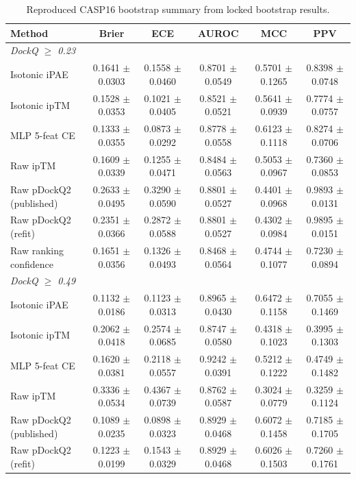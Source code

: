 \begin{table}[t]
\centering
\caption{Reproduced CASP16 bootstrap summary from locked bootstrap results.}
\label{tab:casp16_reproduced}
\begin{tabular}{lccccc}
\toprule
Method & Brier & ECE & AUROC & MCC & PPV \\
\midrule
\multicolumn{6}{l}{\textit{DockQ $\geq$ 0.23}} \\
Isotonic iPAE & 0.1641 $\pm$ 0.0303 & 0.1558 $\pm$ 0.0460 & 0.8701 $\pm$ 0.0549 & 0.5701 $\pm$ 0.1265 & 0.8398 $\pm$ 0.0748 \\
Isotonic ipTM & 0.1528 $\pm$ 0.0353 & 0.1021 $\pm$ 0.0405 & 0.8521 $\pm$ 0.0521 & 0.5641 $\pm$ 0.0939 & 0.7774 $\pm$ 0.0757 \\
MLP 5-feat CE & 0.1333 $\pm$ 0.0355 & 0.0873 $\pm$ 0.0292 & 0.8778 $\pm$ 0.0558 & 0.6123 $\pm$ 0.1118 & 0.8274 $\pm$ 0.0706 \\
Raw ipTM & 0.1609 $\pm$ 0.0339 & 0.1255 $\pm$ 0.0471 & 0.8484 $\pm$ 0.0563 & 0.5053 $\pm$ 0.0967 & 0.7360 $\pm$ 0.0853 \\
Raw pDockQ2 (published) & 0.2633 $\pm$ 0.0495 & 0.3290 $\pm$ 0.0590 & 0.8801 $\pm$ 0.0527 & 0.4401 $\pm$ 0.0968 & 0.9893 $\pm$ 0.0131 \\
Raw pDockQ2 (refit) & 0.2351 $\pm$ 0.0366 & 0.2872 $\pm$ 0.0588 & 0.8801 $\pm$ 0.0527 & 0.4302 $\pm$ 0.0984 & 0.9895 $\pm$ 0.0151 \\
Raw ranking confidence & 0.1651 $\pm$ 0.0356 & 0.1326 $\pm$ 0.0493 & 0.8468 $\pm$ 0.0564 & 0.4744 $\pm$ 0.1077 & 0.7230 $\pm$ 0.0894 \\
\midrule
\multicolumn{6}{l}{\textit{DockQ $\geq$ 0.49}} \\
Isotonic iPAE & 0.1132 $\pm$ 0.0186 & 0.1123 $\pm$ 0.0313 & 0.8965 $\pm$ 0.0430 & 0.6472 $\pm$ 0.1158 & 0.7055 $\pm$ 0.1469 \\
Isotonic ipTM & 0.2062 $\pm$ 0.0418 & 0.2574 $\pm$ 0.0685 & 0.8747 $\pm$ 0.0580 & 0.4318 $\pm$ 0.1023 & 0.3995 $\pm$ 0.1303 \\
MLP 5-feat CE & 0.1620 $\pm$ 0.0381 & 0.2118 $\pm$ 0.0557 & 0.9242 $\pm$ 0.0391 & 0.5212 $\pm$ 0.1222 & 0.4749 $\pm$ 0.1482 \\
Raw ipTM & 0.3336 $\pm$ 0.0534 & 0.4367 $\pm$ 0.0739 & 0.8762 $\pm$ 0.0587 & 0.3024 $\pm$ 0.0779 & 0.3259 $\pm$ 0.1124 \\
Raw pDockQ2 (published) & 0.1089 $\pm$ 0.0235 & 0.0898 $\pm$ 0.0323 & 0.8929 $\pm$ 0.0468 & 0.6072 $\pm$ 0.1458 & 0.7185 $\pm$ 0.1705 \\
Raw pDockQ2 (refit) & 0.1223 $\pm$ 0.0199 & 0.1543 $\pm$ 0.0329 & 0.8929 $\pm$ 0.0468 & 0.6026 $\pm$ 0.1503 & 0.7260 $\pm$ 0.1761 \\

\end{tabular}
\end{table}
